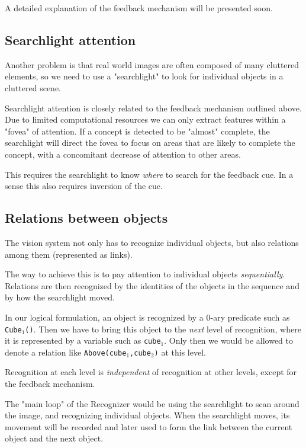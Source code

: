 A detailed explanation of the feedback mechanism will be presented soon.
\underconst

\subsection{Searchlight attention}

Another problem is that real world images are often composed of many cluttered elements, so we need to use a "searchlight" to look for individual objects in a cluttered scene.

Searchlight attention is closely related to the feedback mechanism outlined above. Due to limited computational resources we can only extract features within a "fovea" of attention. If a concept is detected to be "almost" complete, the searchlight will direct the fovea to focus on  areas that are likely to complete the concept, with a concomitant decrease of attention to other areas.

This requires the searchlight to know \emph{where} to search for the feedback cue. In a sense this also requires inversion of the cue.

\subsection{Relations between objects}

The vision system not only has to recognize individual objects, but also relations among them (represented as links).

The way to achieve this is to pay attention to individual objects \emph{sequentially}. Relations are then recognized by the identities of the objects in the sequence and by how the searchlight moved.

In our logical formulation, an object is recognized by a 0-ary predicate such as \texttt{Cube$_1$()}. Then we have to bring this object to the \emph{next} level of recognition, where it is represented by a variable such as \texttt{cube$_1$}. Only then we would be allowed to denote a relation like \texttt{Above(cube$_1$,cube$_2$)} at this level.

Recognition at each level is \emph{independent} of recognition at other levels, except for the feedback mechanism.

The "main loop" of the Recognizer would be using the searchlight to scan around the image, and recognizing individual objects. When the searchlight moves, its movement will be recorded and later used to form the link between the current object and the next object.


